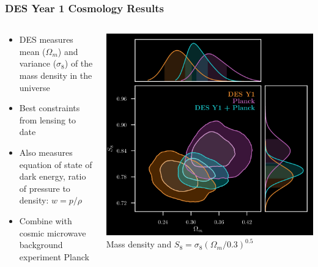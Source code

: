 \documentclass{beamer}
\begin{document}
\frame
{
    \frametitle{DES Year 1 Cosmology Results}


    \begin{columns}
        \begin{column}{0.5\textwidth}
            \begin{itemize}

                \item DES measures mean ($\Omega_m$) and variance ($\sigma_8$) of the mass density
                    in the universe

                \item Best constraints from lensing to date

                \item Also measures equation of state of dark energy, ratio
                    of pressure to density: $w = p/\rho$

                \item Combine with cosmic microwave background experiment Planck


            \end{itemize}
        \end{column}
        \begin{column}{0.5\textwidth}
            \includegraphics[width=\textwidth]{dpnl_l_inv.png}
            \newline
            {\tiny Mass density and $S_8 = \sigma_8 (\Omega_m/0.3)^{0.5}$}
        \end{column}
    \end{columns}
}
\end{document}
